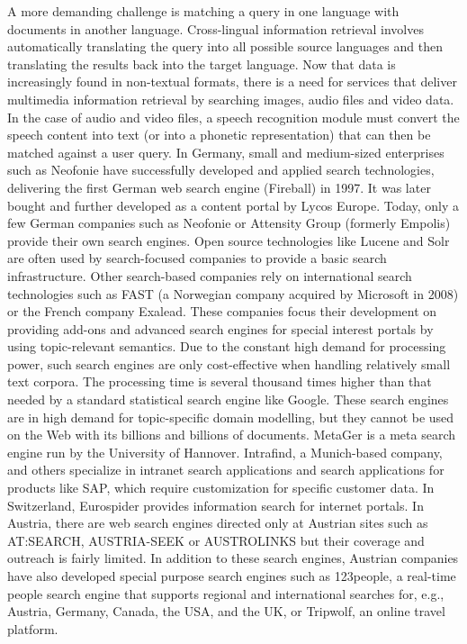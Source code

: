\documentclass[]{../metanetpaper}
\begin{document}
A more demanding challenge is matching a query in one language with documents in another language. Cross-lingual information retrieval involves automatically translating the query into all possible source languages and then translating the results back into the target language. 
Now that data is increasingly found in non-textual formats, there is a need for services that deliver multimedia information retrieval by searching images, audio files and video data. In the case of audio and video files, a speech recognition module must convert the speech content into text (or into a phonetic representation) that can then be matched against a user query.
In Germany, small and medium-sized enterprises such as Neofonie have successfully developed and applied search technologies, delivering the first German web search engine (Fireball) in 1997. It was later bought and further developed as a content portal by Lycos Europe. Today, only a few German companies such as Neofonie or Attensity Group (formerly Empolis) provide their own search engines. Open source technologies like Lucene and Solr are often used by search-focused companies to provide a basic search infrastructure. Other search-based companies rely on international search technologies such as FAST (a Norwegian company acquired by Microsoft in 2008) or the French company Exalead.
These companies focus their development on providing add-ons and advanced search engines for special interest portals by using topic-relevant semantics. Due to the constant high demand for processing power, such search engines are only cost-effective when handling relatively small text corpora. The processing time is several thousand times higher than that needed by a standard statistical search engine like Google. These search engines are in high demand for topic-specific domain modelling, but they cannot be used on the Web with its billions and billions of documents.
MetaGer is a meta search engine run by the University of Hannover. Intrafind, a Munich-based company, and others specialize in intranet search applications and search applications for products like SAP, which require customization for specific customer data. In Switzerland, Eurospider provides information search for internet portals. In Austria, there are web search engines directed only at Austrian sites such as AT:SEARCH, AUSTRIA-SEEK or AUSTROLINKS but their coverage and outreach is fairly limited. In addition to these search engines, Austrian companies have also developed special purpose search engines such as 123people, a real-time people search engine that supports regional and international searches for, e.g., Austria, Germany, Canada, the USA, and the UK, or Tripwolf, an online travel platform. 
\end{document}
